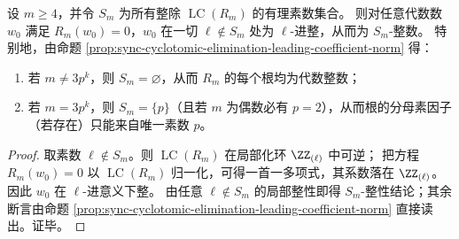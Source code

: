 
\begin{corollary}\label{cor:sync-cyclotomic-elimination-root-sintegrality}
设 \(m\ge 4\)，并令 \(S_m\) 为所有整除 \(\operatorname{LC}(R_m)\) 的有理素数集合。
则对任意代数数 \(w_0\) 满足 \(R_m(w_0)=0\)，\(w_0\) 在一切 \(\ell\notin S_m\) 处为 \(\ell\)-进整，从而为 \(S_m\)-整数。
特别地，由命题 \ref{prop:sync-cyclotomic-elimination-leading-coefficient-norm} 得：
\begin{enumerate}
  \item 若 \(m\neq 3p^k\)，则 \(S_m=\varnothing\)，从而 \(R_m\) 的每个根均为代数整数；
  \item 若 \(m=3p^k\)，则 \(S_m=\{p\}\)（且若 \(m\) 为偶数必有 \(p=2\)），从而根的分母素因子（若存在）只能来自唯一素数 \(p\)。
\end{enumerate}
\end{corollary}
\begin{proof}
取素数 \(\ell\notin S_m\)。则 \(\operatorname{LC}(R_m)\) 在局部化环 \(\ZZ_{(\ell)}\) 中可逆；
把方程 \(R_m(w_0)=0\) 以 \(\operatorname{LC}(R_m)\) 归一化，可得一首一多项式，其系数落在 \(\ZZ_{(\ell)}\)。
因此 \(w_0\) 在 \(\ell\)-进意义下整。
由任意 \(\ell\notin S_m\) 的局部整性即得 \(S_m\)-整性结论；其余断言由命题 \ref{prop:sync-cyclotomic-elimination-leading-coefficient-norm} 直接读出。证毕。
\end{proof}
